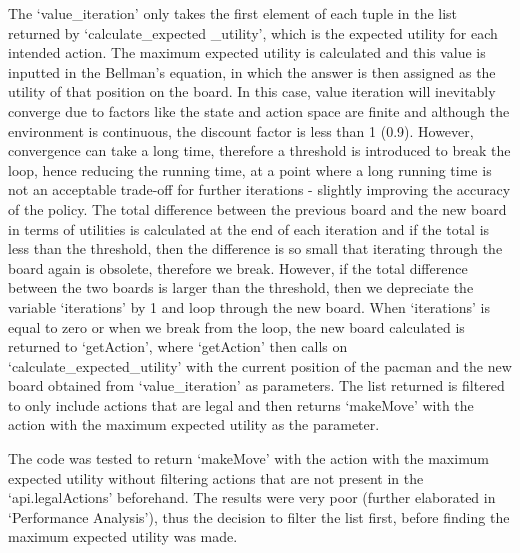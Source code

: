 \documentclass[12pt]{report}
\begin{document}
        The `value\_iteration' only takes the first element of each tuple in the list returned by `calculate\_expected \_utility', which is the expected utility for each intended action. The maximum expected utility is calculated and this value is inputted in the Bellman's equation, in which the answer is then assigned as the utility of that position on the board.
        \newline \newline
        In this case, value iteration will inevitably converge due to factors like the state and action space are finite and although the environment is continuous, the discount factor is less than 1 (0.9). However, convergence can take a long time, therefore a threshold is introduced to break the loop, hence reducing the running time, at a point where a long running time is not an acceptable trade-off for further iterations - slightly improving the accuracy of the policy.
        \newline \newline
        The total difference between the previous board and the new board in terms of utilities is calculated at the end of each iteration and if the total is less than the threshold, then the difference is so small that iterating through the board again is obsolete, therefore we break. However, if the total difference between the two boards is larger than the threshold, then we depreciate the variable `iterations' by 1 and loop through the new board. When `iterations' is equal to zero or when we break from the loop, the new board calculated is returned to `getAction', where `getAction' then calls on `calculate\_expected\_utility' with the current position of the pacman and the new board obtained from `value\_iteration' as parameters. The list returned is filtered to only include actions that are legal and then returns `makeMove' with the action with the maximum expected utility as the parameter.

        The code was tested to return `makeMove' with the action with the maximum expected utility without filtering actions that are not present in the `api.legalActions' beforehand. The results were very poor (further elaborated in `Performance Analysis'), thus the decision to filter the list first, before finding the maximum expected utility was made.
\end{document}

